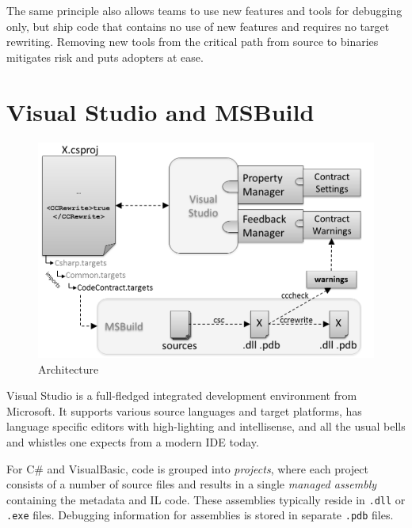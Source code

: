 \documentclass[10pt, conference, compsocconf]{IEEEtran}
\newcommand{\codefamily}{\sffamily}
\newcommand{\csharp}{C\#}
\newcommand{\code}[1]{\lstinline[basicstyle=\codefamily\small]{#1}}
\begin{document}
The same principle also allows teams to use new features and tools for
debugging only, but ship code that contains no use of new features and
requires no target rewriting. Removing new tools from the critical
path from source to binaries mitigates risk and puts
adopters at ease.


\section{Visual Studio and MSBuild}
\label{sec:vs}
\begin{figure}[tb!]
\begin{center}
  \hspace*{-3mm}\includegraphics[width=1.05\columnwidth]{arch.png}
\end{center}
\caption{Architecture}
\label{fig:arch}
\vspace*{-5mm}
\end{figure}
\noindent
Visual Studio is a full-fledged integrated development environment from
Microsoft. It supports various source languages and target platforms,
has language specific editors with high-lighting and intellisense, and
all the usual bells and whistles one expects from a modern IDE today.

For \csharp{} and VisualBasic, code is grouped into \emph{projects},
where each project consists of a number of source files and results in
a single \emph{managed assembly} containing the metadata and IL
code. These assemblies typically reside in \code{.dll} or \code{.exe}
files. Debugging information for assemblies is stored in separate
\code{.pdb} files.
\end{document}
